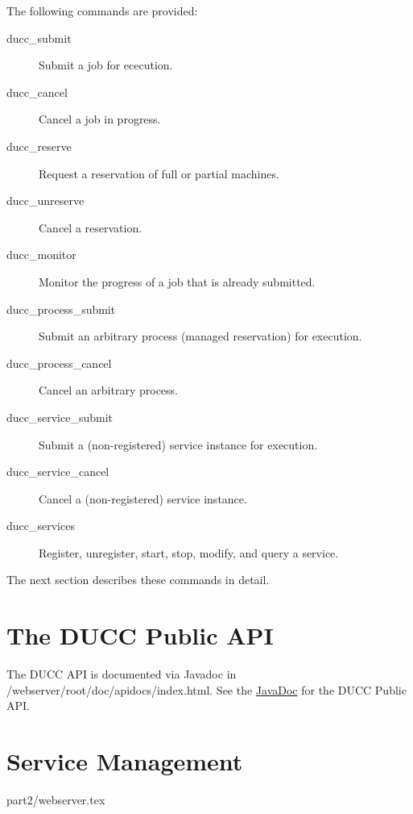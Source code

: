     The following commands are provided:
    \begin{description}
    \item[ducc\_submit] Submit a job for ececution.
    \item[ducc\_cancel] Cancel a job in progress.
    \item[ducc\_reserve] Request a reservation of full or partial machines.
    \item[ducc\_unreserve] Cancel a reservation.
    \item[ducc\_monitor] Monitor the progress of a job that is already submitted.
    \item[ducc\_process\_submit] Submit an arbitrary process (managed reservation) for execution.
    \item[ducc\_process\_cancel] Cancel an arbitrary process.
    \item[ducc\_service\_submit] Submit a (non-registered) service instance for execution.
    \item[ducc\_service\_cancel] Cancel a (non-registered) service instance.
    \item[ducc\_services] Register, unregister, start, stop, modify, and query a service.
    \end{description}
    
    The next section describes these commands in detail.

    
    
    
    
    
    
    
    
    
    
    


\chapter{The DUCC Public API}

\label{chap:api}
   \ifpdf
      The DUCC API is documented via Javadoc in \ducchome/webserver/root/doc/apidocs/index.html.
   \else
      See the \href{apidocs/index.html}{JavaDoc} for the DUCC Public API.
   \fi
\chapter{Service Management}
\label{chap:services}




 {part2/webserver.tex}

